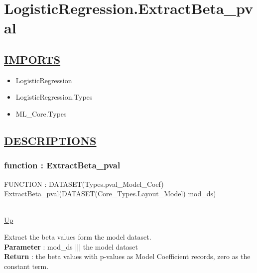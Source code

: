 \chapter*{LogisticRegression.ExtractBeta\_pval}
\hypertarget{LogisticRegression.ExtractBeta_pval}{}

\section*{\underline{IMPORTS}}
\begin{itemize}
\item LogisticRegression
\item LogisticRegression.Types
\item ML\_Core.Types
\end{itemize}

\section*{\underline{DESCRIPTIONS}}
\subsection*{function : ExtractBeta\_pval}
\hypertarget{ecldoc:logisticregression.extractbeta_pval}{FUNCTION : DATASET(Types.pval\_Model\_Coef) ExtractBeta\_pval(DATASET(Core\_Types.Layout\_Model) mod\_ds)} \\
\hyperlink{ecldoc:}{Up} \\
\par
Extract the beta values form the model dataset. \\
\textbf{Parameter} : mod\_ds ||| the model dataset \\
\textbf{Return} : the beta values with p-values as Model Coefficient records, zero as the constant term. \\
